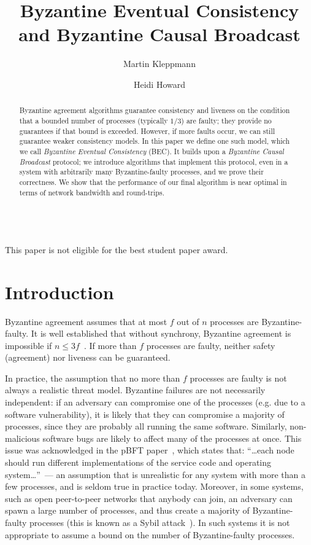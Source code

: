 \documentclass[a4paper,anonymous,USenglish]{lipics-v2019}
\title{Byzantine Eventual Consistency and Byzantine Causal Broadcast}
\author{Martin Kleppmann}{University of Cambridge}{mk428@cst.cam.ac.uk}{https://orcid.org/0000-0001-7252-6958}{Supported by a Leverhulme Trust Early Career Fellowship and by the Isaac Newton Trust.}
\author{Heidi Howard}{University of Cambridge}{hh360@cst.cam.ac.uk}{https://orcid.org/0000-0001-5256-7664}{}
\begin{document}
\maketitle
\begin{abstract}
    Byzantine agreement algorithms guarantee consistency and liveness on the condition that a bounded number of processes (typically $1/3$) are faulty; they provide no guarantees if that bound is exceeded.
    However, if more faults occur, we can still guarantee weaker consistency models. 
    In this paper we define one such model, which we call \emph{Byzantine Eventual Consistency} (BEC).
    It builds upon a \emph{Byzantine Causal Broadcast} protocol; we introduce algorithms that implement this protocol, even in a system with arbitrarily many Byzantine-faulty processes, and we prove their correctness.
    We show that the performance of our final algorithm is near optimal in terms of network bandwidth and round-trips.
\end{abstract}
\maketitle\\[20pt]
This paper is not eligible for the best student paper award.
\newpage

\section{Introduction}

Byzantine agreement assumes that at most $f$ out of $n$ processes are Byzantine-faulty.
It is well established that without synchrony, Byzantine agreement is impossible if $n\leq3f$~\cite{Dwork:1988,Lamport:1982}.
If more than $f$ processes are faulty, neither safety (agreement) nor liveness can be guaranteed.

In practice, the assumption that no more than $f$ processes are faulty is not always a realistic threat model.
Byzantine failures are not necessarily independent: if an adversary can compromise one of the processes (e.g. due to a software vulnerability), it is likely that they can compromise a majority of processes, since they are probably all running the same software. 
Similarly, non-malicious software bugs are likely to affect many of the processes at once.
This issue was acknowledged in the pBFT paper~\cite{Castro:1999}, which states that: ``{\dots}each node should run different implementations of the service code and operating system{\dots}''~--- an assumption that is unrealistic for any system with more than a few processes, and is seldom true in practice today.
Moreover, in some systems, such as open peer-to-peer networks that anybody can join, an adversary can spawn a large number of processes, and thus create a majority of Byzantine-faulty processes (this is known as a Sybil attack~\cite{Douceur:2002}).
In such systems it is not appropriate to assume a bound on the number of Byzantine-faulty processes.
\end{document}
